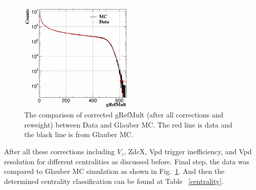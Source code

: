 \begin{figure}[htbp]
\centering
\includegraphics[keepaspectratio,width=0.5\textwidth]{figure/Run14_D0HFT/MB5_AfterALLMCData.png}
\caption{The comparison of corrected gRefMult (after all corrections and reweight) between Data and Glauber MC. The red line is data and the black line is from Glauber MC.\label{fig:MB5_afterAll}}
\end{figure}

After all these corrections including $V_{z}$, ZdcX, Vpd trigger inefficiency, and Vpd resolution for different centralities as discussed before. Final step, the data was compared to Glauber MC simulation as shown in Fig.~\ref{fig:MB5_afterAll}. And then the determined centrality classification can be found at Table ~\ref{centrality}.

